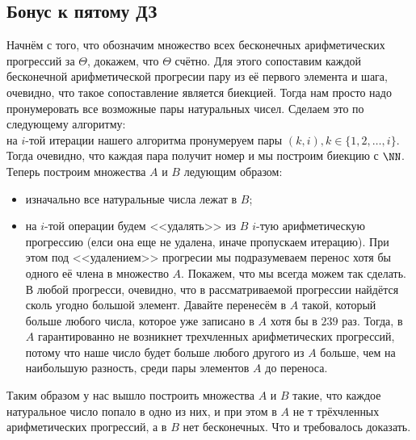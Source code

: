 \subsection{Бонус к пятому ДЗ}


Начнём с того, что обозначим множество всех бесконечных арифметических прогрессий за $\Theta$, докажем, что $\Theta$ счётно. Для этого сопоставим каждой бесконечной арифметической прогресии пару из её первого элемента и шага, очевидно, что такое сопоставление является биекцией. Тогда нам просто надо пронумеровать все возможные пары натуральных чисел. Сделаем это по следующему алгоритму:\\
на $i$-той итерации нашего алгоритма пронумеруем пары $(k, i), k \in \{1, 2, \ldots, i\}$. Тогда очевидно, что каждая пара получит номер и мы построим биекцию с $\NN$.\\
Теперь построим множества $A$ и $B$ ледующим образом:
\begin{itemize}
    \item изначально все натуральные числа лежат в $B$;
    \item на $i$-той операции будем <<удалять>> из $B$ $i$-тую арифметическую прогрессию (елси она еще не удалена, иначе пропускаем итерацию). При этом под <<удалением>> прогресии мы подразумеваем перенос хотя бы одного её члена в множество $A$. Покажем, что мы всегда можем так сделать. В любой прогресси, очевидно, что в рассматриваемой прогрессии найдётся сколь угодно большой элемент. Давайте перенесём в $A$ такой, который больше любого числа, которое уже записано в $A$ хотя бы в $239$ раз. Тогда, в $A$ гарантированно не возникнет трехчленных арифметических прогрессий, потому что наше число будет больше любого другого из $A$ больше, чем на наибольшую разность, среди пары элементов $A$ до переноса.
\end{itemize}
Таким образом у нас вышло построить множества $A$ и $B$ такие, что каждое натуральное число попало в одно из них, и при этом в $A$ не т трёхчленных арифметических прогрессий, а в $B$ нет бесконечных. Что и требовалось доказать.